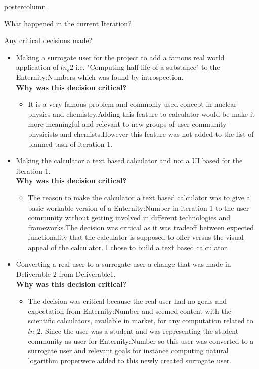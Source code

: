 \documentclass[final,hyperref={pdfpagelabels=false}]{beamer}
\begin{document}
\begin{frame}
\begin{columns}
\begin{column}{.49\textwidth}
\begin{beamercolorbox}[center,wd=\textwidth]{postercolumn}
\begin{minipage}[T]{.95\textwidth}
{\begin{block}{What happened in the current Iteration?}
            \end{block}
            \vfill
              \begin{block}{Any critical decisions made?}
              \begin{itemize}
              \item Making a surrogate user for the project to add a famous real world application of $ln_{e}2$ i.e. "Computing half life of a substance" to the Enternity:Numbers which was found by introspection.\\
             \textbf{ Why was this decision critical?}
                \begin{itemize}
                \item It is a very famous problem and commonly used concept in nuclear physics and chemistry.Adding this feature to calculator would be make it more meaningful and relevant to new groups of user community- physicists and chemists.However this feature was not added to the  list of planned task of iteration 1.
                \end{itemize}
              \item Making the calculator a text based calculator and not a UI based for the iteration 1.\\
              \textbf{ Why was this decision critical?}
                \begin{itemize}
                \item The reason to make the calculator a text based calculator was to give a basic workable version of a Enternity:Number in iteration 1 to the user community without getting involved in different technologies and frameworks.The decision was critical as it was tradeoff between expected functionality that the calculator is supposed to offer versus the visual appeal of the calculator. I chose to build a text based calculator. 
                \end{itemize}
                \item Converting a real user to a surrogate user a change that was made in Deliverable 2 from Deliverable1. \\
             \textbf{ Why was this decision critical?}
                \begin{itemize}
                    \item The decision was critical because the real user had no goals and expectation from Enternity:Number and seemed content with the scientific calculators, available in market, for any computation related to $ln_e{2}$. Since the user was a student and was representing the student community as user for Enternity:Number so this user was converted to a surrogate user and relevant goals for instance computing natural logarithm properwere added to this newly created surrogate user.

\end{itemize}
\end{itemize}
\end{block}}
\end{minipage}
\end{beamercolorbox}
\end{column}
\end{columns}
\end{frame}
\end{document}
